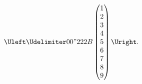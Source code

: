 \documentclass{standalone}
\begin{document}
$
\Uleft\Udelimiter 0 0 "222B
\begin{pmatrix}
  1\\2\\3\\4\\5\\6\\7\\8\\9
\end{pmatrix}
\Uright.
$
\end{document}
